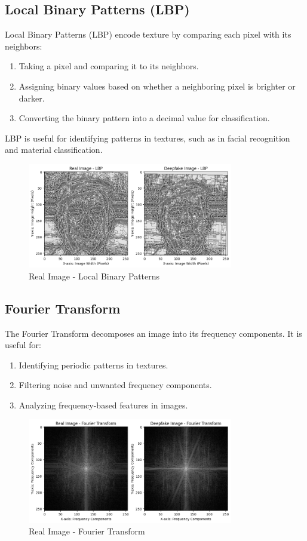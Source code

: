\documentclass{article}
\begin{document}
\subsection{Local Binary Patterns (LBP)}
Local Binary Patterns (LBP) encode texture by comparing each pixel with its neighbors:
\begin{enumerate}
    \item Taking a pixel and comparing it to its neighbors.
    \item Assigning binary values based on whether a neighboring pixel is brighter or darker.
    \item Converting the binary pattern into a decimal value for classification.
\end{enumerate}
LBP is useful for identifying patterns in textures, such as in facial recognition and material classification.

\begin{figure}[h!]
    \centering
    \includegraphics[width=0.8\textwidth]{real_lbp.png}
    \caption{Real Image - Local Binary Patterns}
    \label{fig:real_lbp}
\end{figure}

\subsection{Fourier Transform}
The Fourier Transform decomposes an image into its frequency components. It is useful for:
\begin{enumerate}
    \item Identifying periodic patterns in textures.
    \item Filtering noise and unwanted frequency components.
    \item Analyzing frequency-based features in images.
\end{enumerate}

\begin{figure}[h!]
    \centering
    \includegraphics[width=0.8\textwidth]{real_fourier.png}
    \caption{Real Image - Fourier Transform}
    \label{fig:real_fourier}
\end{figure}
\end{document}
